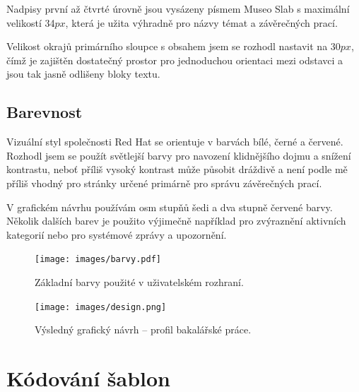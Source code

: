 Nadpisy první až čtvrté úrovně jsou vysázeny písmem Museo Slab s maximální velikostí 34$px$, která je užita výhradně pro názvy témat a závěrečných prací.

Velikost okrajů primárního sloupce s obsahem jsem se rozhodl nastavit na 30$px$, čímž je zajištěn dostatečný prostor pro jednoduchou orientaci mezi odstavci a jsou tak jasně odlišeny bloky textu.

\subsection{Barevnost}

Vizuální styl společnosti Red Hat se orientuje v barvách bílé, černé a červené. Rozhodl jsem se použít světlejší barvy pro navození klidnějšího dojmu a snížení kontrastu, neboť příliš vysoký kontrast může působit dráždivě a není podle mě příliš vhodný pro stránky určené primárně pro správu závěrečných prací.

V grafickém návrhu používám osm stupňů šedi a dva stupně červené barvy. Několik dalších barev je použito výjimečně například pro zvýraznění aktivních kategorií nebo pro systémové zprávy a upozornění.

\begin{figure}[htbp]
    \centering
    \texttt{[image: images/barvy.pdf]}
    \caption{Základní barvy použité v uživatelském rozhraní.}
    \label{img:colors}
\end{figure}

\begin{figure}[htbp]
    \centering
    \texttt{[image: images/design.png]}
    \caption{Výsledný grafický návrh -- profil bakalářské práce.}
    \label{img:design}
\end{figure}

\section{Kódování šablon}

